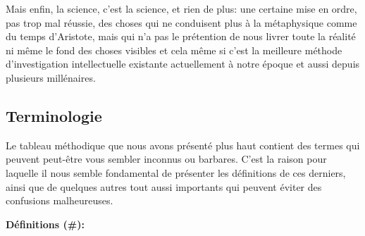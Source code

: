 Mais enfin, la science, c'est la science, et rien de plus: une certaine mise en ordre, pas trop mal réussie, des choses qui ne conduisent plus à la métaphysique comme du temps d'Aristote, mais qui n'a pas le prétention de nous livrer toute la réalité ni même le fond des choses visibles et cela même si c'est la meilleure méthode d'investigation intellectuelle existante actuellement à notre époque et aussi depuis plusieurs millénaires.

	\pagebreak
	\subsection{Terminologie}

Le tableau méthodique que nous avons présenté plus haut contient des termes qui peuvent peut-être vous sembler inconnus ou barbares. C'est la raison pour laquelle il nous semble fondamental de présenter les définitions de ces derniers, ainsi que de quelques autres tout aussi importants qui peuvent éviter des confusions malheureuses.

\textbf{Définitions (\#\mydef):}

